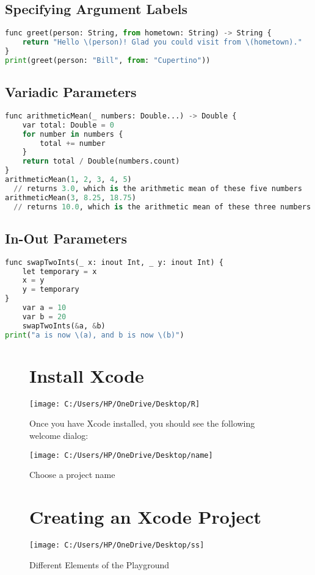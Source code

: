\documentclass[14pt]{extarticle}
\begin{document}
\subsection{Specifying Argument Labels}
\begin{lstlisting}[language=python]
func greet(person: String, from hometown: String) -> String { 
	return "Hello \(person)! Glad you could visit from \(hometown)."	
}
print(greet(person: "Bill", from: "Cupertino"))
\end{lstlisting}

\subsection{Variadic Parameters}
\begin{lstlisting}[language=python]
func arithmeticMean(_ numbers: Double...) -> Double { 
	var total: Double = 0
	for number in numbers { 
		total += number
	} 
	return total / Double(numbers.count) 
}
arithmeticMean(1, 2, 3, 4, 5) 
  // returns 3.0, which is the arithmetic mean of these five numbers
arithmeticMean(3, 8.25, 18.75) 
  // returns 10.0, which is the arithmetic mean of these three numbers
\end{lstlisting}

\subsection{In-Out Parameters}
\begin{lstlisting}[language=python]
func swapTwoInts(_ x: inout Int, _ y: inout Int) { 
	let temporary = x
	x = y
	y = temporary
}
	var a = 10
	var b = 20
	swapTwoInts(&a, &b) 
print("a is now \(a), and b is now \(b)") 
\end{lstlisting}



\begin{figure}
	\section{Install Xcode}	
	\centering
	\texttt{[image: C:/Users/HP/OneDrive/Desktop/R]}
	\caption{Once you have Xcode installed, you should see the following welcome dialog:}
	\label{fig:r}
\end{figure}

\begin{figure}
	\centering
	\texttt{[image: C:/Users/HP/OneDrive/Desktop/name]}
	\caption{Choose a project name}
	\label{fig:name}
\end{figure}
\begin{figure}
	\section{Creating an Xcode Project}
	\centering
	\texttt{[image: C:/Users/HP/OneDrive/Desktop/ss]}
	\caption{Different Elements of the Playground}
	\label{fig:ss}
\end{figure}
\end{document}
